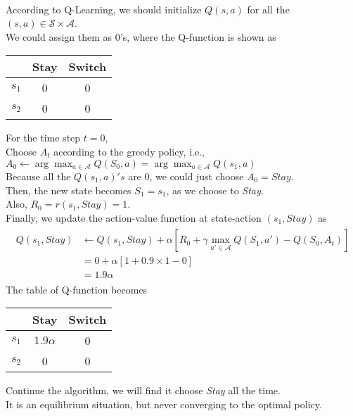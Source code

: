 \documentclass{myhw}
\begin{document}
\begin{homeworkProblem}
\begin{homeworkSection}
\\
According to Q-Learning, we should initialize $Q(s,a)$ for all the $(s,a) \in \mathcal{S} \times \mathcal{A}$. \\
We could assign them as 0's, where the Q-function is shown as 
\begin{center}
\begin{tabular}{c|c|c}
  & Stay & Switch \\ 
 \hline
 $s_1$ & 0 & 0 \\  
 \hline
 $s_2$ & 0 & 0    
\end{tabular} 
\end{center} 
For the time step $t=0$, \\
Choose $A_t$ according to the greedy policy, i.e., 
$A_0 \leftarrow \arg\max_{a\in\mathcal{A}}Q(S_0, a)=\arg\max_{a\in\mathcal{A}}Q(s_1, a)$ \\
Because all the $Q(s_1,a)'s$ are 0, we could just choose $A_0 = Stay$. \\
Then, the new state becomes $S_1=s_1$, as we choose to \emph{Stay}. \\
Also, $R_0 = r(s_1,Stay)=1$. \\
Finally, we update the action-value function at state-action $(s_1,Stay)$ as 
\begin{gather*}
\begin{aligned}
Q(s_1,Stay) &\leftarrow Q(s_1,Stay) + \alpha [R_0 + \gamma \max_{a'\in\mathcal{A}}Q(S_1,a')-Q(S_0,A_t)] \\
&= 0 + \alpha [1 + 0.9 \times 1 - 0] \\
&= 1.9 \alpha
\end{aligned}
\end{gather*}
The table of Q-function becomes 
\begin{center}
\begin{tabular}{c|c|c}
  & Stay & Switch \\ 
 \hline
 $s_1$ & $1.9\alpha$ & 0 \\  
 \hline
 $s_2$ & 0 & 0    
\end{tabular} 
\end{center}
Continue the algorithm, we will find it choose \emph{Stay} all the time. \\
It is an equilibrium situation, but never converging to the optimal policy.
\end{homeworkSection}
\end{homeworkProblem}
\end{document}
